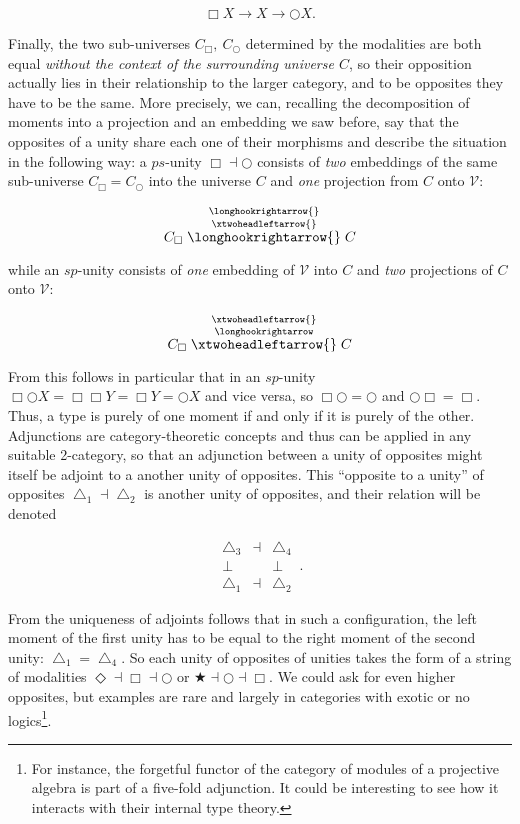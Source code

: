 \documentclass{article}
\begin{document}
$$\Box X\rightarrow X \rightarrow\bigcirc X.$$

Finally, the two sub-universes $C_\Box ,\ C_\bigcirc$ determined by the modalities are both equal \emph{without
the context of the surrounding universe $C$}, so their opposition actually lies in their relationship
to the larger category, and to be opposites they have to be the same. More precisely, we can, recalling
the decomposition of moments into a projection and an embedding we saw before, say that the opposites
of a unity share each one of their morphisms and describe the situation in the following way: a $ps$-unity
$\Box\dashv\bigcirc$ consists of \emph{two} embeddings of the same sub-universe $C_\Box=C_\bigcirc$ into
the universe $C$ and \emph{one} projection from $C$ onto $\mathcal{V}$:

$$C_\Box\stackrel{\longhookrightarrow{}}{\stackrel{\xtwoheadleftarrow{}}{\longhookrightarrow{}}}C$$

while an $sp$-unity consists of \emph{one} embedding of $\mathcal{V}$ into $C$ and \emph{two} projections
of $C$ onto $\mathcal{V}$:

$$C_\Box\stackrel{\xtwoheadleftarrow{}}{\stackrel{\longhookrightarrow}{\xtwoheadleftarrow{}}}C$$

From this follows in particular that in an $sp$-unity $\Box\bigcirc X=\Box\Box Y=\Box Y= \bigcirc X$ and
vice versa, so $\Box\bigcirc=\bigcirc$ and $\bigcirc\Box=\Box$. Thus, a type is purely of one moment if
and only if it is purely of the other. \\

Adjunctions are category-theoretic concepts and thus can be applied in any suitable 2-category, so that
an adjunction between a unity of opposites might itself be adjoint to a another unity of opposites\cite{Shu}.
This ``opposite to a unity'' of opposites $\bigtriangleup_1\dashv\bigtriangleup_2$ is another unity of
opposites, and their relation will be denoted 


$$
  \begin{array}{ccc}
    \bigtriangleup_3 &\dashv& \bigtriangleup_4
    \\
    \bot & & \bot
    \\
    \bigtriangleup_1 &\dashv& \bigtriangleup_2
    \end{array}
  \,.
$$

From the uniqueness of adjoints follows that in such a configuration, the left moment of the first unity
has to be equal to the right moment of the second unity: $\bigtriangleup_1=\bigtriangleup_4$. So each
unity of opposites of unities takes the form of a string of modalities $\Diamond\dashv\Box\dashv\bigcirc$
or $\bigstar\dashv\bigcirc\dashv\Box$. We could ask for even higher opposites, but examples are rare and
largely in categories with exotic or no logics\footnote{For instance, the forgetful functor of the category
of modules of a projective algebra is part of a five-fold adjunction. It could be interesting to see how
it interacts with their internal type theory.}. \\
\end{document}
